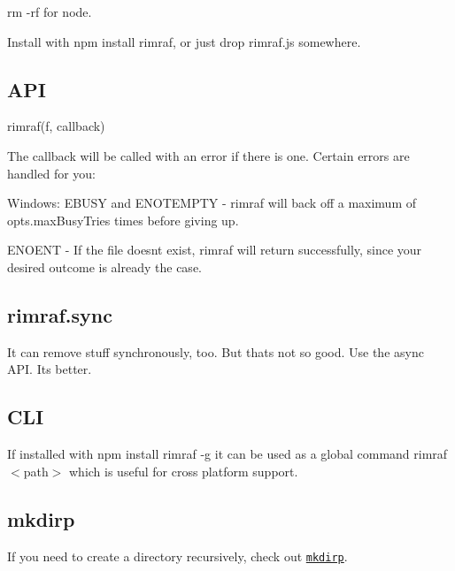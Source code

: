 {\ttfamily rm -\/rf} for node.

Install with {\ttfamily npm install rimraf}, or just drop rimraf.\+js somewhere.

\subsection*{A\+P\+I}

{\ttfamily rimraf(f, callback)}

The callback will be called with an error if there is one. Certain errors are handled for you\+:


\begin{DoxyItemize}
\item Windows\+: {\ttfamily E\+B\+U\+S\+Y} and {\ttfamily E\+N\+O\+T\+E\+M\+P\+T\+Y} -\/ rimraf will back off a maximum of {\ttfamily opts.\+max\+Busy\+Tries} times before giving up.
\item {\ttfamily E\+N\+O\+E\+N\+T} -\/ If the file doesn\textquotesingle{}t exist, rimraf will return successfully, since your desired outcome is already the case.
\end{DoxyItemize}

\subsection*{rimraf.\+sync}

It can remove stuff synchronously, too. But that\textquotesingle{}s not so good. Use the async A\+P\+I. It\textquotesingle{}s better.

\subsection*{C\+L\+I}

If installed with {\ttfamily npm install rimraf -\/g} it can be used as a global command {\ttfamily rimraf $<$path$>$} which is useful for cross platform support.

\subsection*{mkdirp}

If you need to create a directory recursively, check out \href{https://github.com/substack/node-mkdirp}{\tt mkdirp}. 